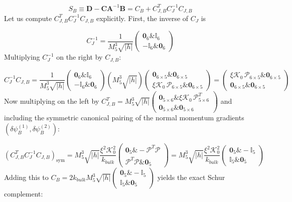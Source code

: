 \documentclass[aps,prd,onecolumn,superscriptaddress,nofootinbib,longbibliography,10pt]{revtex4-2}
\begin{document}
  \[ S_B \equiv \mathbf{D} - \mathbf{C}\mathbf{A}^{-1}\mathbf{B} = C_B + C_{J,B}^T C_J^{-1} C_{J,B} \]
  Let us compute \(C_{J,B}^T C_J^{-1} C_{J,B}\) explicitly. First, the inverse of \(C_J\) is


  \[ C_J^{-1} = \frac{1}{M_5^3\sqrt{|h|}}\begin{pmatrix} \mathbf{0}_6 \& \mathbb{I}_6 \\ -\mathbb{I}_6 \& \mathbf{0}_6 \end{pmatrix} \]
  Multiplying \(C_J^{-1}\) on the right by \(C_{J,B}\):


  \[ C_J^{-1} C_{J,B} = \frac{1}{M_5^3\sqrt{|h|}}\begin{pmatrix} \mathbf{0}_6 \& \mathbb{I}_6 \\ -\mathbb{I}_6 \& \mathbf{0}_6 \end{pmatrix}\left(M_5^3\sqrt{|h|}\right)\begin{pmatrix} \mathbf{0}_{6\times 5} \& \mathbf{0}_{6\times 5} \\ \xi\mathcal{K}_0\,\mathcal{P}_{6\times 5} \& \mathbf{0}_{6\times 5} \end{pmatrix} = \begin{pmatrix} \xi\mathcal{K}_0\,\mathcal{P}_{6\times 5} \& \mathbf{0}_{6\times 5} \\ \mathbf{0}_{6\times 5} \& \mathbf{0}_{6\times 5} \end{pmatrix} \]
  Now multiplying on the left by \(C_{J,B}^T = M_5^3\sqrt{|h|}\begin{pmatrix} \mathbf{0}_{5\times 6} \& \xi\mathcal{K}_0\,\mathcal{P}_{5\times 6}^T \\ \mathbf{0}_{5\times 6} \& \mathbf{0}_{5\times 6} \end{pmatrix}\) and including the symmetric canonical pairing of the normal momentum gradients \((\delta\psi_B^{(1)}, \delta\psi_B^{(2)})\):


  \[ \left(C_{J,B}^T C_J^{-1} C_{J,B}\right)_{\text{sym}} = M_5^3\sqrt{|h|}\frac{\xi^2\mathcal{K}_0^2}{k_{bulk}}\begin{pmatrix} \mathbf{0}_5 \& -\mathcal{P}^T\mathcal{P} \\ \mathcal{P}^T\mathcal{P} \& \mathbf{0}_5 \end{pmatrix} = M_5^3\sqrt{|h|}\frac{\xi^2\mathcal{K}_0^2}{k_{bulk}}\begin{pmatrix} \mathbf{0}_5 \& -\mathbb{I}_5 \\ \mathbb{I}_5 \& \mathbf{0}_5 \end{pmatrix} \]
  Adding this to \(C_B = 2k_{bulk}M_5^3\sqrt{|h|}\begin{pmatrix} \mathbf{0}_5 \& -\mathbb{I}_5 \\ \mathbb{I}_5 \& \mathbf{0}_5 \end{pmatrix}\) yields the exact Schur complement:
\end{document}
